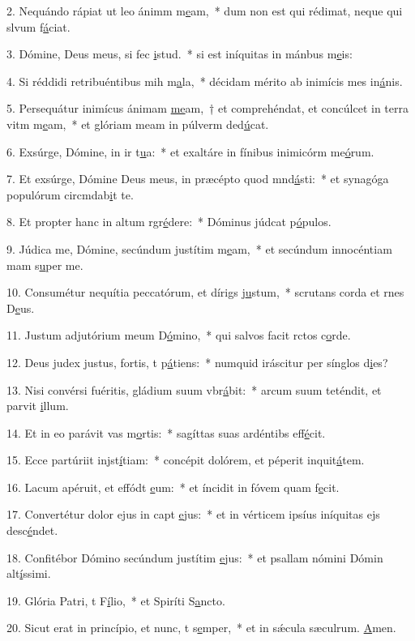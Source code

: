 2. Nequándo rápiat ut leo ánimm m\uline{e}am,~* dum non est qui rédimat, neque qui slvum f\uline{á}ciat.\par 
3. Dómine, Deus meus, si fec \uline{i}stud.~* si est iníquitas in mánbus m\uline{e}is:\par 
4. Si réddidi retribuéntibus mih m\uline{a}la,~* décidam mérito ab inimícis mes in\uline{á}nis.\par 
5. Persequátur inimícus ánimam \uline{me}am,~† et comprehéndat, et concúlcet in terra vitm m\uline{e}am,~* et glóriam meam in púlverm ded\uline{ú}cat.\par 
6. Exsúrge, Dómine, in ir t\uline{u}a:~* et exaltáre in fínibus inimicórm me\uline{ó}rum.\par 
7. Et exsúrge, Dómine Deus meus, in præcépto quod mnd\uline{á}sti:~* et synagóga populórum circmdab\uline{i}t te.\par 
8. Et propter hanc in altum rgr\uline{é}dere:~* Dóminus júdcat p\uline{ó}pulos.\par 
9. Júdica me, Dómine, secúndum justítim m\uline{e}am,~* et secúndum innocéntiam mam s\uline{u}per me.\par 
10. Consumétur nequítia peccatórum, et dírigs j\uline{u}stum,~* scrutans corda et rnes D\uline{e}us.\par 
11. Justum adjutórium meum  D\uline{ó}mino,~* qui salvos facit rctos c\uline{o}rde.\par 
12. Deus judex justus, fortis, t p\uline{á}tiens:~* numquid iráscitur per sínglos d\uline{i}es?\par 
13. Nisi convérsi fuéritis, gládium suum vbr\uline{á}bit:~* arcum suum teténdit, et parvit \uline{i}llum.\par 
14. Et in eo parávit vas m\uline{o}rtis:~* sagíttas suas ardéntibs eff\uline{é}cit.\par 
15. Ecce partúriit injst\uline{í}tiam:~* concépit dolórem, et péperit inquit\uline{á}tem.\par 
16. Lacum apéruit, et effódt \uline{e}um:~* et íncidit in fóvem quam f\uline{e}cit.\par 
17. Convertétur dolor ejus in capt \uline{e}jus:~* et in vérticem ipsíus iníquitas ejs desc\uline{é}ndet.\par 
18. Confitébor Dómino secúndum justítim \uline{e}jus:~* et psallam nómini Dómin alt\uline{í}ssimi.\par 
19. Glória Patri, t F\uline{í}lio,~* et Spiríti S\uline{a}ncto.\par 
20. Sicut erat in princípio, et nunc, t s\uline{e}mper,~* et in sǽcula sæculrum. \uline{A}men.\par 

